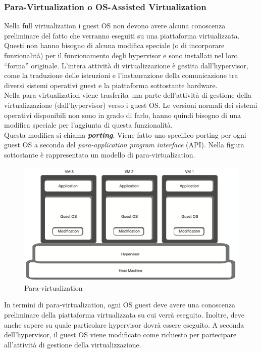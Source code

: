 \documentclass{article}
\begin{document}
\subsubsection{Para-Virtualization o OS-Assisted Virtualization}
Nella full virtualization i guest OS non devono avere alcuna conoscenza preliminare del fatto che verranno eseguiti su una piattaforma virtualizzata. Questi non hanno bisogno di alcuna modifica speciale (o di incorporare funzionalità) per il funzionamento degli hypervisor e sono installati nel loro “forma” originale. L'intera attività di virtualizzazione è gestita dall'hypervisor, come la traduzione delle istruzioni e l'instaurazione della comunicazione tra diversi sistemi operativi guest e la piattaforma sottostante hardware. \\
Nella para-virtualization viene trasferita una parte dell'attività di gestione della virtualizzazione (dall'hypervisor) verso i guest OS. Le versioni normali dei sistemi operativi disponibili non sono in grado di farlo, hanno quindi bisogno di una modifica speciale per l’aggiunta di questa funzionalità. \\
Questa modifica si chiama \textit{\textbf{porting}}. Viene fatto uno specifico porting per ogni guest OS a seconda del \textit{para-application program interface} (API). Nella figura sottostante è rappresentato un modello di para-virtualization.
\begin{figure}[H]
    \centering
    \includegraphics[scale=0.8]{img/Para-virtualization.png}
    \caption{Para-virtualization}
\end{figure}\noindent
In termini di para-virtualization, ogni OS guest deve avere una conoscenza preliminare della piattaforma virtualizzata su cui verrà eseguito. Inoltre, deve anche sapere su quale particolare hypervisor dovrà essere eseguito. A seconda dell'hypervisor, il guest OS viene modificato come richiesto per partecipare all'attività di gestione della virtualizzazione. \\ 
\end{document}
